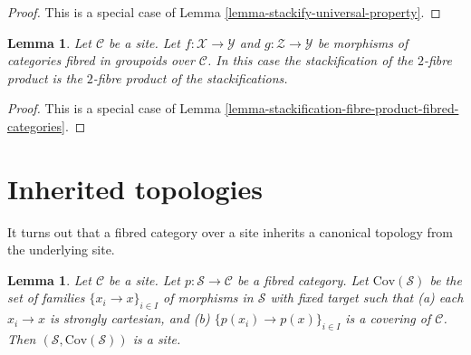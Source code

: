 \documentclass{stacks-project}
\theoremstyle{plain}
\newtheorem{lemma}[subsection]{Lemma}
\theoremstyle{definition}
\theoremstyle{remark}
\numberwithin{equation}{subsection}
\begin{document}
\begin{proof}
This is a special case of
Lemma \ref{lemma-stackify-universal-property}.
\end{proof}

\begin{lemma}
\label{lemma-stackification-fibre-product-categories-fibred-in-groupoids}
Let $\mathcal{C}$ be a site.
Let $f : \mathcal{X} \to \mathcal{Y}$ and $g : \mathcal{Z} \to \mathcal{Y}$
be morphisms of categories fibred in groupoids over $\mathcal{C}$.
In this case the stackification of the $2$-fibre product is the $2$-fibre
product of the stackifications.
\end{lemma}

\begin{proof}
This is a special case of
Lemma \ref{lemma-stackification-fibre-product-fibred-categories}.
\end{proof}









\section{Inherited topologies}
\label{section-topology}

\noindent
It turns out that a fibred category over a site inherits a canonical
topology from the underlying site.

\begin{lemma}
\label{lemma-topology-inherited}
Let $\mathcal{C}$ be a site. Let $p : \mathcal{S} \to \mathcal{C}$
be a fibred category. Let $\text{Cov}(\mathcal{S})$
be the set of families $\{x_i \to x\}_{i \in I}$ of morphisms in $\mathcal{S}$
with fixed target such that (a) each $x_i \to x$ is strongly cartesian,
and (b) $\{p(x_i) \to p(x)\}_{i \in I}$ is a covering of $\mathcal{C}$.
Then $(\mathcal{S}, \text{Cov}(\mathcal{S}))$ is a site.
\end{lemma}
\end{document}
